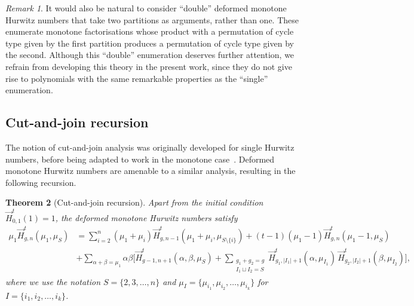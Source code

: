 \documentclass[a4paper]{article}
\theoremstyle{plain}
\newtheorem{theorem}{Theorem}
\numberwithin{theorem}{section}
\theoremstyle{definition}
\theoremstyle{remark}
\newtheorem{remark}[theorem]{Remark}
\newcommand{\HN}[3]{\vec{H}^t_{#1,#2}(#3)}
\begin{document}
\begin{remark}
It would also be natural to consider ``double'' deformed monotone Hurwitz numbers that take two partitions as arguments, rather than one. These enumerate monotone factorisations whose product with a permutation of cycle type given by the first partition produces a permutation of cycle type given by the second. Although this ``double'' enumeration deserves further attention, we refrain from developing this theory in the present work, since they do not give rise to polynomials with the same remarkable properties as the ``single'' enumeration.
\end{remark}



\subsection{Cut-and-join recursion}

The notion of cut-and-join analysis was originally developed for single Hurwitz numbers, before being adapted to work in the monotone case~\cite{gou-jac-vai00, gou-gua-nov13a}. Deformed monotone Hurwitz numbers are amenable to a similar analysis, resulting in the following recursion.


\begin{theorem}[Cut-and-join recursion] \label{thm:cutjoin}
Apart from the initial condition $\HN{0}{1}{1} = 1$, the deformed monotone Hurwitz numbers satisfy
\begin{align} \label{eq:cutandjoin}
\mu_1 \HN{g}{n}{\mu_1, \mu_S} &= \sum_{i=2}^n (\mu_1 + \mu_i) \HN{g}{n-1}{\mu_1 + \mu_i, \mu_{S \setminus\{i\}}} + (t - 1) (\mu_1-1) \HN{g}{n}{\mu_1-1, \mu_S} \nonumber \\
&+ \sum_{\alpha+\beta=\mu_1} \alpha \beta \Bigg[ \HN{g-1}{n+1}{\alpha, \beta, \mu_S} + \sum_{\substack{g_1+g_2 = g \\ I_1 \sqcup I_2= S}} \HN{g_1}{|I_1|+1}{\alpha, \mu_{I_1}} \, \HN{g_2}{|I_2|+1}{\beta, \mu_{I_2}} \Bigg],
\end{align}
where we use the notation $S = \{2, 3, \ldots, n\}$ and $\mu_I = \{\mu_{i_1}, \mu_{i_2}, \ldots, \mu_{i_k}\}$ for $I = \{i_1, i_2, \ldots, i_k\}$.
\end{theorem}
\end{document}
